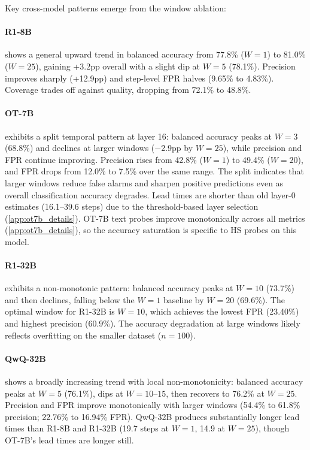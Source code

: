 Key cross-model patterns emerge from the window ablation:

\paragraph{R1-8B} shows a general upward trend in balanced accuracy from 77.8\% ($W{=}1$) to 81.0\% ($W{=}25$), gaining +3.2pp overall with a slight dip at $W{=}5$ (78.1\%). Precision improves sharply (+12.9pp) and step-level FPR halves (9.65\% to 4.83\%). Coverage trades off against quality, dropping from 72.1\% to 48.8\%.

\paragraph{OT-7B} exhibits a split temporal pattern at layer 16: balanced accuracy peaks at $W{=}3$ (68.8\%) and declines at larger windows ($-$2.9pp by $W{=}25$), while precision and FPR continue improving. Precision rises from 42.8\% ($W{=}1$) to 49.4\% ($W{=}20$), and FPR drops from 12.0\% to 7.5\% over the same range. The split indicates that larger windows reduce false alarms and sharpen positive predictions even as overall classification accuracy degrades. Lead times are shorter than old layer-0 estimates (16.1--39.6 steps) due to the threshold-based layer selection (\cref{app:ot7b_details}). OT-7B text probes improve monotonically across all metrics (\cref{app:ot7b_details}), so the accuracy saturation is specific to HS probes on this model.

\paragraph{R1-32B} exhibits a non-monotonic pattern: balanced accuracy peaks at $W{=}10$ (73.7\%) and then declines, falling below the $W{=}1$ baseline by $W{=}20$ (69.6\%). The optimal window for R1-32B is $W{=}10$, which achieves the lowest FPR (23.40\%) and highest precision (60.9\%). The accuracy degradation at large windows likely reflects overfitting on the smaller dataset ($n{=}100$).

\paragraph{QwQ-32B} shows a broadly increasing trend with local non-monotonicity: balanced accuracy peaks at $W{=}5$ (76.1\%), dips at $W{=}10$--$15$, then recovers to 76.2\% at $W{=}25$. Precision and FPR improve monotonically with larger windows (54.4\% to 61.8\% precision; 22.76\% to 16.94\% FPR). QwQ-32B produces substantially longer lead times than R1-8B and R1-32B (19.7 steps at $W{=}1$, 14.9 at $W{=}25$), though OT-7B's lead times are longer still.

